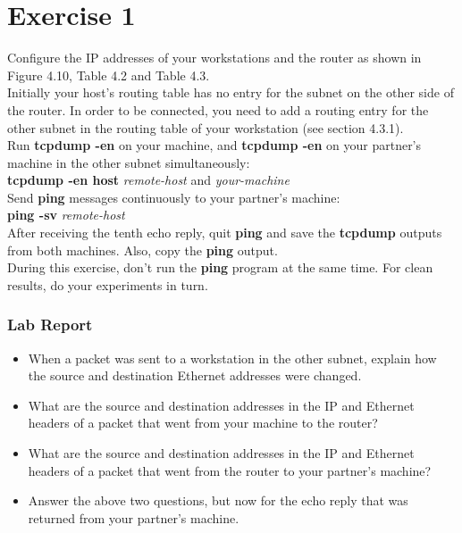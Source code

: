 \documentclass[10pt,a4paper]{article}
\numberwithin{equation}{section}
\numberwithin{figure}{section}
\numberwithin{table}{section}
\begin{document}
    \section{Exercise 1}
    Configure the IP addresses of your workstations and the router as shown in Figure 4.10, Table 4.2 and Table 4.3. \\
    Initially your host’s routing table has no entry for the subnet on the other side of the router.
    In order to be connected, you need to add a routing entry for the other subnet in the routing table of your workstation (see section 4.3.1). \\
    Run \textbf{tcpdump -en} on your machine, and \textbf{tcpdump -en} on your partner’s machine in the other subnet simultaneously: \\
    \textbf{tcpdump -en host} \textit{remote-host} and \textit{your-machine} \\
    Send \textbf{ping} messages continuously to your partner’s machine: \\
    \textbf{ping -sv} \textit{remote-host} \\
    After receiving the tenth echo reply, quit \textbf{ping} and save the \textbf{tcpdump} outputs from both machines.
    Also, copy the \textbf{ping} output. \\
    During this exercise, don’t run the \textbf{ping} program at the same time.
    For clean results, do your experiments in turn.
    \subsubsection*{Lab Report}
    \begin{itemize}
        \setlength{\itemindent}{0pt}
        \item When a packet was sent to a workstation in the other subnet, explain how the source and destination Ethernet addresses were changed.
        \item What are the source and destination addresses in the IP and Ethernet headers of a packet that went from your machine to the router?
        \item What are the source and destination addresses in the IP and Ethernet headers of a packet that went from the router to your partner’s machine?
        \item Answer the above two questions, but now for the echo reply that was returned from your partner’s machine.
    \end{itemize}
\end{document}
